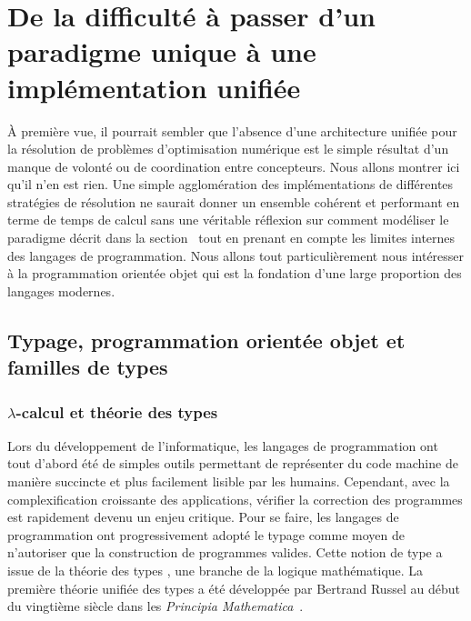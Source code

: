 \section{De la dif\-ficulté à passer d'un paradigme uni\-que à une implémentation unifiée}
\label{sec:chap1_model2impl}


À première vue, il pourrait sembler que l'absence d'une architecture
unifiée pour la résolution de problèmes d'optimisation numérique est
le simple résultat d'un manque de volonté ou de coordination entre
concepteurs. Nous allons montrer ici qu'il n'en est rien. Une simple
agglomération des implémentations de différentes stratégies de
résolution ne saurait donner un ensemble cohérent et performant en
terme de temps de calcul sans une véritable réflexion sur comment
modéliser le paradigme décrit dans la section \label{sec:chap1_optim}
tout en prenant en compte les limites internes des langages de
programmation. Nous allons tout particulièrement nous intéresser à la
programmation orientée objet qui est la fondation d'une large
proportion des langages modernes.


\subsection{Typage, programmation orientée objet et familles de types}
\label{sec:chap1_model2impl_typage}

\subsubsection{$\lambda$-calcul et théorie des types}
\label{sec:chap1_model2impl_typage_lambda}

Lors du développement de l'informatique, les langages de programmation
ont tout d'abord été de simples outils permettant de représenter du
code machine de manière succincte et plus facilement lisible par les
humains. Cependant, avec la complexification croissante des
applications, vérifier la correction des programmes est rapidement
devenu un enjeu critique. Pour se faire, les langages de programmation
ont progressivement adopté le typage comme moyen de n'autoriser que la
construction de programmes valides. Cette notion de type a issue de la
théorie des types , une branche de la logique
mathématique. La première théorie unifiée des types a été développée
par Bertrand Russel  au début du vingtième
siècle dans les \emph{Principia Mathematica} \citep{pm}.


